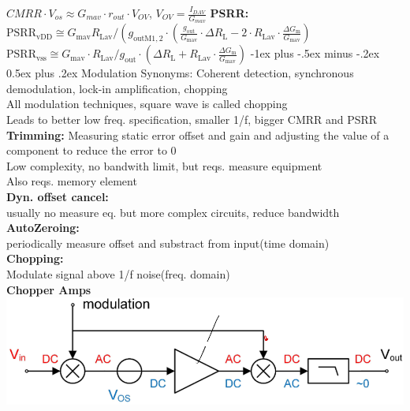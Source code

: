 \documentclass[5pt,landscape]{article}
\makeatletter
\renewcommand{\section}{\@startsection{section}{1}{0mm}%
                                {-1ex plus -.5ex minus -.2ex}%
                                {0.5ex plus .2ex}%
                                {\normalfont\large\bfseries}}
\makeatother
\begin{document}
\begin{multicols*}{5}
$ CMRR \cdot V_{os} \approx G_{mav} \cdot r_{out} \cdot V_{OV} $, $ V_{OV} = \frac{I_{DAV}}{G_{mav}} $
\textbf{PSRR:}\\
$ \mathrm{PSRR}_{\mathrm{vDD}} \cong G_{\operatorname{mav}} R_{\mathrm{Lav}} /\left(g_{\mathrm{outM} 1,2} \cdot\left(\frac{g_{\mathrm{out}}}{G_{\mathrm{mav}}} \cdot \Delta R_{\mathrm{L}}-2 \cdot R_{\mathrm{Lav}} \cdot \frac{\Delta G_{\mathrm{m}}}{G_{\mathrm{mav}}}\right)\right. $\\
$ \mathrm{PSRR}_{\mathrm{vss}} \cong G_{\operatorname{mav}} \cdot R_{\mathrm{Lav}} / g_{\mathrm{out}} \cdot\left(\Delta R_{\mathrm{L}}+R_{\mathrm{Lav}} \cdot \frac{\Delta G_{\mathrm{m}}}{G_{\mathrm{mav}}}\right) $
\section{Modulation}
Synonyms: Coherent detection, synchronous demodulation, lock-in amplification, chopping\\
All modulation techniques, square wave is called chopping\\
Leads to better low freq. specification, smaller 1/f, bigger CMRR and PSRR\\
\textbf{Trimming:} Measuring static error offset and gain and adjusting the value of a component to reduce the error to 0\\
Low complexity, no bandwith limit, but reqs. measure equipment\\
Also reqs. memory element\\
\textbf{Dyn. offset cancel:}\\
usually no measure eq. but more complex circuits, reduce bandwidth\\
\textbf{AutoZeroing:}\\
periodically measure offset and substract from input(time domain)\\
\textbf{Chopping:}\\
Modulate signal above 1/f noise(freq. domain)\\
\textbf{Chopper Amps}\\
\includegraphics[width=\columnwidth]{images/chop_amp.png}\\

\end{multicols*}
\end{document}
